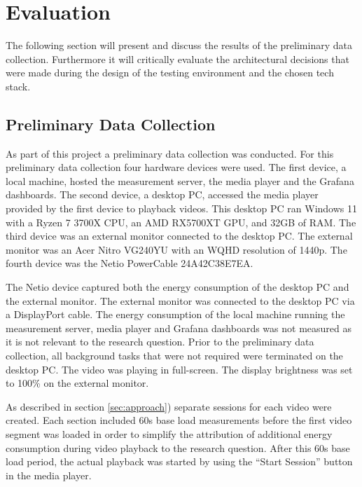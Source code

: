 \label{sec:evaluation}
\section{Evaluation}

The following section will present and discuss the results of the preliminary data collection. Furthermore it will critically evaluate the architectural decisions that were made during the design of the testing environment and the chosen tech stack. 

\subsection{Preliminary Data Collection}
As part of this project a preliminary data collection was conducted. For this preliminary data collection four hardware devices were used. The first device, a local machine, hosted the measurement server, the media player and the Grafana dashboards. The second device, a desktop PC, accessed the media player provided by the first device to playback videos. This desktop PC ran Windows 11 with a Ryzen 7 3700X CPU, an AMD RX5700XT GPU, and 32GB of RAM. The third device was an external monitor connected to the desktop PC. The external monitor was an Acer Nitro VG240YU with an WQHD resolution of 1440p. The fourth device was the Netio PowerCable 24A42C38E7EA. 



The Netio device captured both the energy consumption of the desktop PC and the external monitor. The external monitor was connected to the desktop PC via a DisplayPort cable. The energy consumption of the local machine running the measurement server, media player and Grafana dashboards was not measured as it is not relevant to the research question. Prior to the preliminary data collection, all background tasks that were not required were terminated on the desktop PC. The video was playing in full-screen. The display brightness was set to 100\% on the external monitor. 

As described in section \ref{sec:approach}) separate sessions for each video were created. Each section included 60s base load measurements before the first video segment was loaded in order to simplify the attribution of additional energy consumption during video playback to the research question. After this 60s base load period, the actual playback was started by using the “Start Session” button in the media player. 

